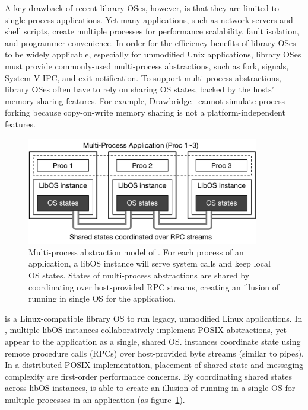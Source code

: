 A key drawback of recent library OSes, however,
is that they are limited to single-process applications.
Yet many applications, such as network servers and
shell scripts,
create multiple processes
for
performance scalability, fault isolation, and programmer convenience.
In order for the efficiency benefits of library OSes to be widely applicable,
especially for unmodified Unix applications,
library OSes must  provide commonly-used multi-process abstractions,
such as fork,  signals, System V IPC, and exit notification.
To support multi-process abstractions, library OSes often have to rely on sharing OS states,
backed by the hosts' memory sharing features.
For example, Drawbridge~\citep{porter11drawbridge} cannot simulate process forking because copy-on-write memory sharing is not a platform-independent features.


\begin{figure}[t!]
\centering
\includegraphics[width=4in]{graphene/figures/concept.pdf}
\caption[Multi-process abstraction model of \sysname{} \libos{}]
{Multi-process abstraction model of \sysname{} \libos{}. For each process of an application, a libOS instance will serve system calls and keep local OS states. States of multi-process abstractions are shared by coordinating over host-provided RPC streams, creating an illusion of running in single OS for the application.}
\label{fig:graphene:concept}
\end{figure}

{\bf \sysname{}} is a Linux-compatible library OS
to run legacy, unmodified Linux applications.
In \sysname{}, multiple libOS instances collaboratively implement
POSIX abstractions,
yet appear to the application
as a single, shared OS.
\sysname{} instances coordinate state using remote procedure calls (RPCs) over
host-provided byte streams (similar to pipes).
In a distributed POSIX implementation, placement of shared state and messaging complexity
are first-order performance concerns.
By coordinating shared states across libOS instances,
\sysname{} is able to create an illusion 
of running in a single OS
for multiple processes in an application (as figure~\ref{fig:graphene:concept}).

